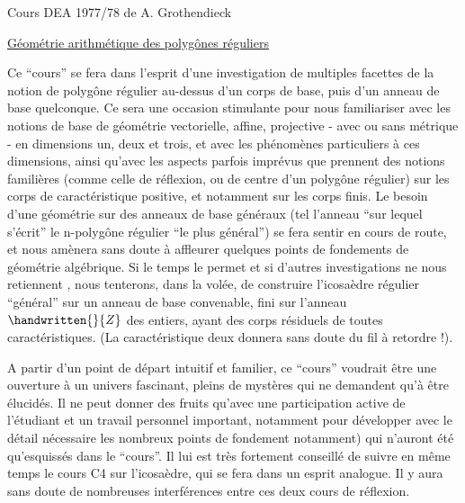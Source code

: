 \begin{center}
Cours DEA 1977/78 de A. Grothendieck

\uline{Géométrie arithmétique des polygônes réguliers}
\end{center}

{\reversemarginpar\margin{\handwritten{!}}\normalmarginpar}%
Ce ``cours'' se fera dans l'esprit d'une investigation  de multiples facettes de la notion de polygône régulier au-dessus d'un corps de base, puis d'un anneau de base quelconque. Ce sera une occasion stimulante pour nous familiariser avec les notions de base de géométrie vectorielle, affine, projective - avec ou sans métrique - en dimensions un, deux et trois, et avec les phénomènes particuliers à ces dimensions, ainsi qu'avec les aspects parfois imprévus que prennent des notions familières (comme celle de réflexion, ou de centre d'un polygône régulier) sur les corps de caractéristique positive, et notamment sur les corps finis. Le besoin d'une géométrie sur des anneaux de base généraux (tel l'anneau ``sur lequel s'écrit'' le $\mathrm{n}$-polygône régulier ``le plus général'') se fera sentir en cours de route, et nous amènera sans doute à affleurer quelques points de fondements de géométrie algébrique. Si le temps le permet et si d'autres investigations ne nous retiennent , nous tenterons, dans la volée, de construire l'icosaèdre régulier ``général'' sur un anneau de base convenable, fini sur l'anneau ${\handwritten{\mathbb}{Z}}$ des entiers, ayant des corps résiduels de toutes caractéristiques. (La caractéristique deux \hspace{.5em}donnera sans doute du fil à retordre !).

A partir d'un point de départ intuitif et familier, ce ``cours'' voudrait être une ouverture à un univers fascinant, pleins de mystères qui ne demandent qu'à être élucidés. Il ne peut donner des fruits qu'avec une participation active de l'étudiant et un travail personnel important, notamment pour développer avec le détail nécessaire les nombreux points \handwritten{(}de fondement notamment) qui n'auront été qu'esquissés dans le ``cours''. Il lui est très fortement conseillé de suivre en même temps le cours C4 sur l'icosaèdre, qui se fera dans un esprit analogue. Il y aura sans doute de nombreuses interférences entre ces deux cours de réflexion.
